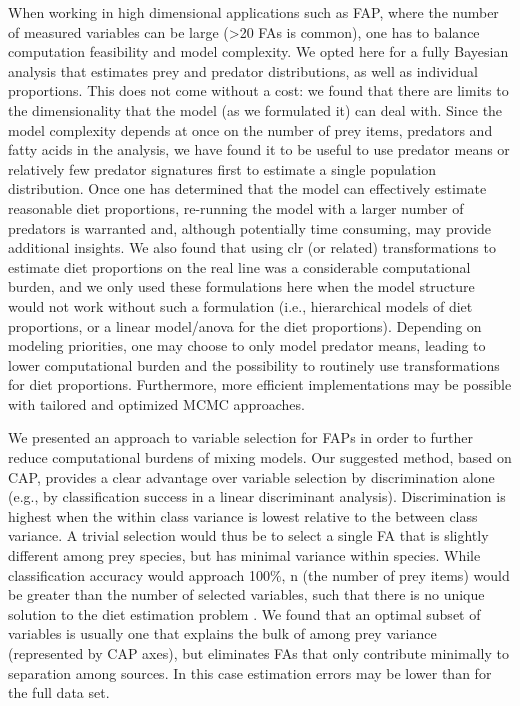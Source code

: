 \documentclass[12pt]{article}%
\begin{document}
\begin{spacing}{1.9}
\begin{flushleft}
When working in high dimensional applications such as FAP, where the
number of measured variables can be large (>20 FAs is common), one has
to balance computation feasibility and model complexity. We opted here
for a fully Bayesian analysis that estimates prey and predator
distributions, as well as individual proportions. This does not come
without a cost: we found that there are limits to the dimensionality
that the model (as we formulated it) can deal with. Since the model
complexity depends at once on the number of prey items, predators and
fatty acids in the analysis, we have found it to be useful to use
predator means or relatively few predator signatures first to estimate
a single population distribution. Once one has determined that the
model can effectively estimate reasonable diet proportions, re-running
the model with a larger number of predators is warranted and, although
potentially time consuming, may provide additional insights. We also
found that using clr (or related) transformations to estimate diet
proportions on the real line \citep{parnell_bayesian_2012} was a considerable
computational burden, and we only used these formulations here when
the model structure would not work without such a formulation (i.e.,
hierarchical models of diet proportions, or a linear model/anova for
the diet proportions). Depending on modeling priorities, one may choose to only
model predator means, leading to lower computational burden and the
possibility to routinely use transformations for diet
proportions. Furthermore, more efficient implementations may be
possible with tailored and optimized MCMC approaches.

We presented an approach to variable selection for FAPs in order to
further reduce computational burdens of mixing models. Our suggested
method, based on CAP, provides a clear advantage over variable
selection by discrimination alone (e.g., by classification success in
a linear discriminant analysis). Discrimination is highest when the
within class variance is lowest relative to the between class
variance. A trivial selection would thus be to select a single FA that
is slightly different among prey species, but has minimal variance
within species. While classification accuracy would approach 100\%, n (the number of prey items) would be
greater than the number of selected variables, such that there is no
unique solution to the diet estimation problem \citep{phillips_source_2003}.
We found that an optimal subset of variables is usually one that
explains the bulk of among prey variance (represented by CAP axes),
but eliminates FAs that only contribute minimally to separation
among sources. In this case estimation errors may be lower than
for the full data set.
 


\end{flushleft}
\end{spacing}
\end{document}
